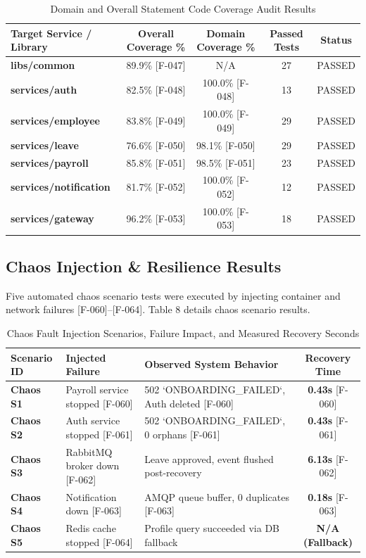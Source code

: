\documentclass[11pt,a4paper]{article}
\begin{document}
\begin{table}[htbp]
\caption{Domain and Overall Statement Code Coverage Audit Results}
\centering
\begin{tabularx}{\linewidth}{l c c c c}
\toprule
\textbf{Target Service / Library} & \textbf{Overall Coverage \%} & \textbf{Domain Coverage \%} & \textbf{Passed Tests} & \textbf{Status} \\
\midrule
\textbf{libs/common} & 89.9\% [F-047] & N/A & 27 & PASSED \\
\textbf{services/auth} & 82.5\% [F-048] & 100.0\% [F-048] & 13 & PASSED \\
\textbf{services/employee} & 83.8\% [F-049] & 100.0\% [F-049] & 29 & PASSED \\
\textbf{services/leave} & 76.6\% [F-050] & 98.1\% [F-050] & 29 & PASSED \\
\textbf{services/payroll} & 85.8\% [F-051] & 98.5\% [F-051] & 23 & PASSED \\
\textbf{services/notification} & 81.7\% [F-052] & 100.0\% [F-052] & 12 & PASSED \\
\textbf{services/gateway} & 96.2\% [F-053] & 100.0\% [F-053] & 18 & PASSED \\
\bottomrule
\end{tabularx}
\end{table}

\subsection{Chaos Injection \& Resilience Results}
Five automated chaos scenario tests were executed by injecting container and network failures [F-060]--[F-064]. Table 8 details chaos scenario results.

\begin{table}[htbp]
\caption{Chaos Fault Injection Scenarios, Failure Impact, and Measured Recovery Seconds}
\centering
\begin{tabularx}{\linewidth}{l X X c}
\toprule
\textbf{Scenario ID} & \textbf{Injected Failure} & \textbf{Observed System Behavior} & \textbf{Recovery Time} \\
\midrule
\textbf{Chaos S1} & Payroll service stopped [F-060] & 502 `ONBOARDING\_FAILED`, Auth deleted [F-060] & \textbf{0.43s} [F-060] \\
\textbf{Chaos S2} & Auth service stopped [F-061] & 502 `ONBOARDING\_FAILED`, 0 orphans [F-061] & \textbf{0.43s} [F-061] \\
\textbf{Chaos S3} & RabbitMQ broker down [F-062] & Leave approved, event flushed post-recovery & \textbf{6.13s} [F-062] \\
\textbf{Chaos S4} & Notification down [F-063] & AMQP queue buffer, 0 duplicates [F-063] & \textbf{0.18s} [F-063] \\
\textbf{Chaos S5} & Redis cache stopped [F-064] & Profile query succeeded via DB fallback & \textbf{N/A (Fallback)} \\
\bottomrule
\end{tabularx}
\end{table}
\end{document}
